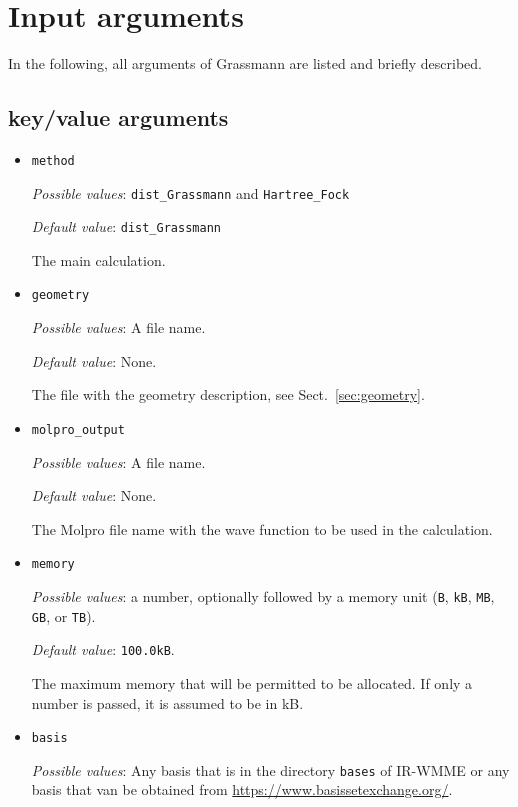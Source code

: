 \section{Input arguments}
\label{sec:inputargs}

In the following, all arguments of Grassmann are listed and briefly described.

\subsection{key/value arguments}

\begin{itemize}
\item \verb+method+

  \emph{Possible values}: \verb+dist_Grassmann+ and \verb+Hartree_Fock+

  \emph{Default value}: \verb+dist_Grassmann+

  The main calculation.

\item \verb+geometry+

  \emph{Possible values}: A file name.

  \emph{Default value}: None.

  The file with the geometry description, see Sect.~\ref{sec:geometry}.

\item \verb+molpro_output+

  \emph{Possible values}: A file name.

  \emph{Default value}: None.

  The Molpro file name with the wave function to be used in the calculation.

\item \verb+memory+

  \emph{Possible values}: a number, optionally followed by a memory unit
  (\verb+B+, \verb+kB+, \verb+MB+, \verb+GB+, or \verb+TB+).

  \emph{Default value}: \verb+100.0kB+.

  The maximum memory that will be permitted to be allocated.
  If only a number is passed, it is assumed to be in kB.
  
\item \verb+basis+

  \emph{Possible values}: Any basis that is in the directory \verb+bases+ of IR-WMME or any basis that van be obtained from \href{https://www.basissetexchange.org/}{https://www.basissetexchange.org/}.


\end{itemize}
